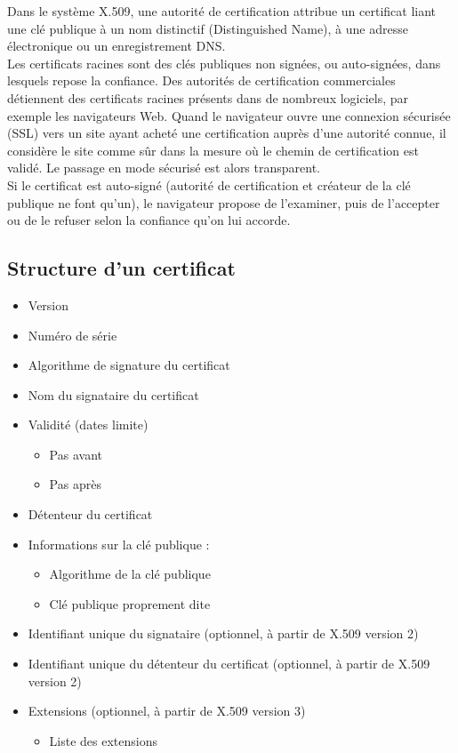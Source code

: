 \documentclass[a4paper,11pt,french]{article}
\begin{document}
Dans le système X.509, une autorité de certification attribue un certificat liant une clé publique à un nom distinctif (Distinguished Name), à une adresse électronique ou un enregistrement DNS.\\

Les certificats racines sont des clés publiques non signées, ou auto-signées, dans lesquels repose la confiance. Des autorités de certification commerciales détiennent des certificats racines présents dans de nombreux logiciels, par exemple les navigateurs Web. Quand le navigateur ouvre une connexion sécurisée (SSL) vers un site ayant acheté une certification auprès d'une autorité connue, il considère le site comme sûr dans la mesure où le chemin de certification est validé. Le passage en mode sécurisé est alors transparent.\\

Si le certificat est auto-signé (autorité de certification et créateur de la clé publique ne font qu'un), le navigateur propose de l'examiner, puis de l'accepter ou de le refuser selon la confiance qu'on lui accorde.\\

\subsection{Structure d'un certificat}

\begin{itemize}
\item Version
\item Numéro de série
\item Algorithme de signature du certificat
\item Nom du signataire du certificat
\item Validité (dates limite) 
  \begin{itemize} 
  \item Pas avant
  \item Pas après
  \end{itemize}
\item Détenteur du certificat
\item Informations sur la clé publique :
  \begin{itemize}
  \item Algorithme de la clé publique
  \item Clé publique proprement dite
  \end{itemize}
\item Identifiant unique du signataire (optionnel, à partir de X.509 version 2)
\item Identifiant unique du détenteur du certificat (optionnel, à partir de X.509 version 2)
\item Extensions (optionnel, à partir de X.509 version 3)
  \begin{itemize}
  \item Liste des extensions
  \end{itemize}
\end{itemize}
\end{document}
